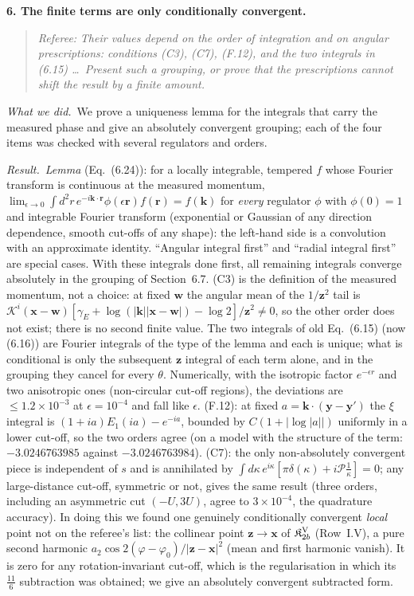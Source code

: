 \documentclass[a4paper,11pt]{article}
\def\v#1{\mathbf{#1}}
\newcommand{\Kv}{\mathcal K}
\newcommand{\point}[1]{\par\medskip\noindent\textbf{#1}\par}
\newcommand{\referee}[1]{\begin{quote}\small\emph{Referee:} \emph{#1}\end{quote}}
\newcommand{\done}{\par\noindent\emph{What we did.}\ }
\newcommand{\result}{\par\noindent\emph{Result.}\ }
\begin{document}
\point{6. The finite terms are only conditionally convergent.}
\referee{Their values depend on the order of integration and on angular prescriptions: conditions (C3), (C7), (F.12), and the two integrals in (6.15) \dots\ Present such a grouping, or prove that the prescriptions cannot shift the result by a finite amount.}
\done We prove a uniqueness lemma for the integrals that carry the measured phase and give an absolutely convergent grouping; each of the four items was checked with several regulators and orders.
\result \emph{Lemma} (Eq.~(6.24)): for a locally integrable, tempered $f$ whose Fourier transform is continuous at the measured momentum, $\lim_{\epsilon\to0}\int d^2r\,e^{-i\v k\cdot\v r}\phi(\epsilon\v r)f(\v r)=\hat f(\v k)$ for \emph{every} regulator $\phi$ with $\phi(0)=1$ and integrable Fourier transform (exponential or Gaussian of any direction dependence, smooth cut-offs of any shape): the left-hand side is a convolution with an approximate identity. ``Angular integral first'' and ``radial integral first'' are special cases. With these integrals done first, all remaining integrals converge absolutely in the grouping of Section~6.7.
(C3) is the definition of the measured momentum, not a choice: at fixed $\v w$ the angular mean of the $1/\v z^2$ tail is $\Kv^i(\v x-\v w)[\gamma_E+\log(|\v k||\v x-\v w|)-\log2]/\v z^2\neq0$, so the other order does not exist; there is no second finite value.
The two integrals of old Eq.~(6.15) (now (6.16)) are Fourier integrals of the type of the lemma and each is unique; what is conditional is only the subsequent $\v z$ integral of each term alone, and in the grouping they cancel for every $\theta$. Numerically, with the isotropic factor $e^{-\epsilon r}$ and two anisotropic ones (non-circular cut-off regions), the deviations are $\le1.2\times10^{-3}$ at $\epsilon=10^{-4}$ and fall like $\epsilon$.
(F.12): at fixed $a=\v k\cdot(\v y-\v y')$ the $\xi$ integral is $(1+ia)E_1(ia)-e^{-ia}$, bounded by $C(1+|\log|a||)$ uniformly in a lower cut-off, so the two orders agree (on a model with the structure of the term: $-3.0246763985$ against $-3.0246763984$).
(C7): the only non-absolutely convergent piece is independent of $s$ and is annihilated by $\int d\kappa\,e^{i\kappa}[\pi\delta(\kappa)+i\mathcal P\frac1\kappa]=0$; any large-distance cut-off, symmetric or not, gives the same result (three orders, including an asymmetric cut $(-U,3U)$, agree to $3\times10^{-4}$, the quadrature accuracy).
In doing this we found one genuinely conditionally convergent \emph{local} point not on the referee's list: the collinear point $\v z\to\v x$ of $\mathfrak K^{\rm V}_{2b}$ (Row~I.V), a pure second harmonic $a_2\cos2(\varphi-\varphi_0)/|\v z-\v x|^2$ (mean and first harmonic vanish). It is zero for any rotation-invariant cut-off, which is the regularisation in which its $\frac{11}{6}$ subtraction was obtained; we give an absolutely convergent subtracted form.
\end{document}
